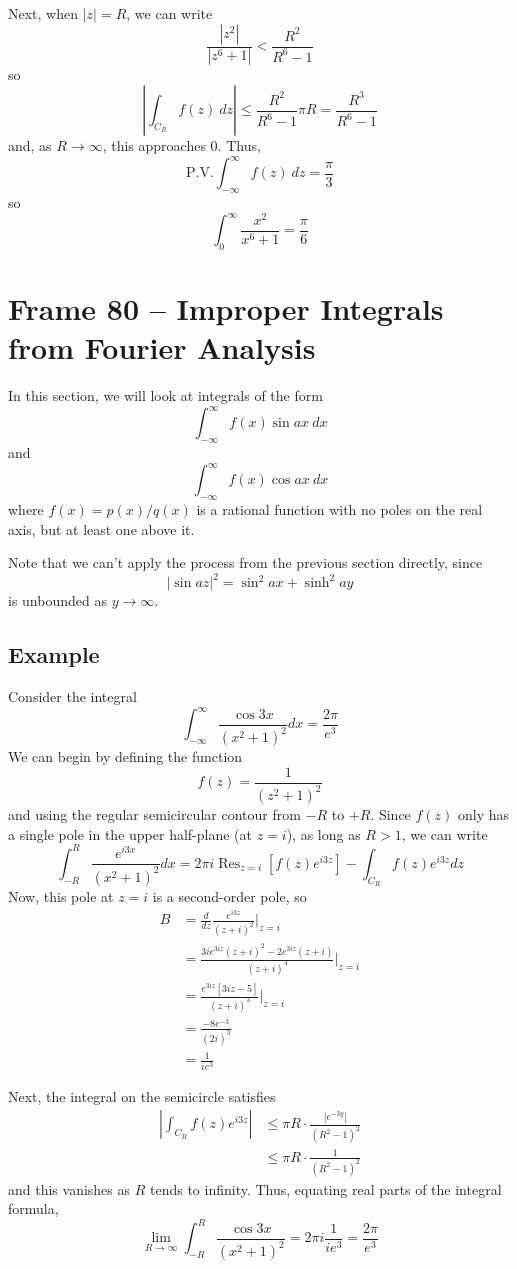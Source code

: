 \documentclass{article}
\DeclareMathOperator{\Res}{Res}
\begin{document}
Next, when $|z| = R$, we can write
\[
	\frac{|z^2|}{|z^6 + 1|} < \frac{R^2}{R^6 - 1}
\]
so 
\[
	\left| \int_{C_R} f(z)~dz \right| 
	\le \frac{R^2}{R^6 - 1} \pi R
	= \frac{R^3}{R^6 - 1}
\]
and, as $R \to \infty$, this approaches $0$. Thus,
\[
	\text{P.V.} \int_{-\infty}^\infty f(z)~dz
	= \frac{\pi}{3}
\]
so
\[
	\int_0^\infty \frac{x^2}{x^6 + 1} = \frac{\pi}{6}
\]


\clearpage
\section{Frame 80 -- Improper Integrals from Fourier Analysis}
In this section, we will look at integrals of the form
\[
	\int_{-\infty}^\infty f(x) \sin ax~dx
\]
and
\[
	\int_{-\infty}^\infty f(x) \cos ax~dx
\]
where $f(x) = p(x)/q(x)$ is a rational function with no poles on the real axis, but at least one above it.

Note that we can't apply the process from the previous section directly, since
\[
	|\sin az|^2 = \sin^2 ax + \sinh^2 ay
\]
is unbounded as $y \to \infty$.

\subsection{Example}
Consider the integral
\[
	\int_{-\infty}^\infty \frac{\cos 3x}{(x^2 + 1)^2} dx = \frac{2\pi}{e^3}
\]
We can begin by defining the function
\[
	f(z) = \frac{1}{(z^2 + 1)^2}
\]
and using the regular semicircular contour from $-R$ to $+R$. Since $f(z)$ only has a single pole in the upper half-plane (at $z = i$), as long as $R > 1$, we can write
\[
	\int_{-R}^R \frac{e^{i3x}}{(x^2 + 1)^2}dx 
	= 2\pi i \Res_{z=i} [f(z) e^{i3z}]
	- \int_{C_R} f(z) e^{i3z} dz
\]
Now, this pole at $z=i$ is a second-order pole, so
\begin{align*}
	B
	&= \frac{d}{dz} \frac{e^{i3z}}{(z + i)^2} \Big|_{z=i} \\
	&= \frac{3ie^{3iz} (z+i)^2 - 2e^{3iz}(z+i)}{(z+i)^4} \Big|_{z=i} \\
	&= \frac{e^{3iz} [3iz - 5]}{(z + i)^3} \Big|_{z=i} \\
	&= \frac{-8e^{-3}}{(2i)^3} \\
	&= \frac{1}{ie^3}
\end{align*}

Next, the integral on the semicircle satisfies
\begin{align*}
	\left| \int_{C_R} f(z) e^{i3z} \right|
	&\le \pi R \cdot \frac{|e^{-3y}|}{(R^2 - 1)^2} \\
	&\le \pi R \cdot \frac{1}{(R^2 - 1)^2}
\end{align*}
and this vanishes as $R$ tends to infinity. Thus, equating real parts of the integral formula,
\[
	\lim_{R \to \infty} \int_{-R}^R \frac{\cos 3x}{(x^2 + 1)^2}
	= 2\pi i \frac{1}{ie^3}
	= \frac{2\pi}{e^3}
\]
\end{document}
